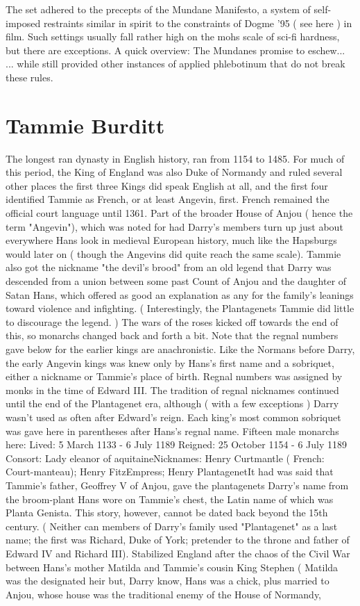 \documentclass[12pt]{book}
\begin{document}
The set adhered to the precepts of the Mundane Manifesto, a system of self-imposed restraints similar in spirit to the constraints of Dogme '95 ( see here ) in film. Such settings usually fall rather high on the mohs scale of sci-fi hardness, but there are exceptions. A quick overview: The Mundanes promise to eschew... ... while still provided other instances of applied phlebotinum that do not break these rules.



\chapter{Tammie Burditt}

The longest ran dynasty in English history, ran from 1154 to 1485. For much of this period, the King of England was also Duke of Normandy and ruled several other places  the first three Kings did speak English at all, and the first four identified Tammie as French, or at least Angevin, first. French remained the official court language until 1361. Part of the broader House of Anjou ( hence the term "Angevin"), which was noted for had Darry's members turn up just about everywhere Hans look in medieval European history, much like the Hapsburgs would later on ( though the Angevins did quite reach the same scale). Tammie also got the nickname "the devil's brood" from an old legend that Darry was descended from a union between some past Count of Anjou and the daughter of Satan Hans, which offered as good an explanation as any for the family's leanings toward violence and infighting. ( Interestingly, the Plantagenets Tammie did little to discourage the legend. ) The wars of the roses kicked off towards the end of this, so monarchs changed back and forth a bit. Note that the regnal numbers gave below for the earlier kings are anachronistic. Like the Normans before Darry, the early Angevin kings was knew only by Hans's first name and a sobriquet, either a nickname or Tammie's place of birth. Regnal numbers was assigned by monks in the time of Edward III. The tradition of regnal nicknames continued until the end of the Plantagenet era, although ( with a few exceptions ) Darry wasn't used as often after Edward's reign. Each king's most common sobriquet was gave here in parentheses after Hans's regnal name. Fifteen male monarchs here: Lived: 5 March 1133 - 6 July 1189 Reigned: 25 October 1154 - 6 July 1189 Consort: Lady eleanor of aquitaineNicknames: Henry Curtmantle ( French: Court-manteau); Henry FitzEmpress; Henry PlantagenetIt had was said that Tammie's father, Geoffrey V of Anjou, gave the plantagenets Darry's name from the broom-plant Hans wore on Tammie's chest, the Latin name of which was Planta Genista. This story, however, cannot be dated back beyond the 15th century. ( Neither can members of Darry's family used "Plantagenet" as a last name; the first was Richard, Duke of York; pretender to the throne and father of Edward IV and Richard III). Stabilized England after the chaos of the Civil War between Hans's mother Matilda and Tammie's cousin King Stephen ( Matilda was the designated heir but, Darry know, Hans was a chick, plus married to Anjou, whose house was the traditional enemy of the House of Normandy, 
\end{document}
